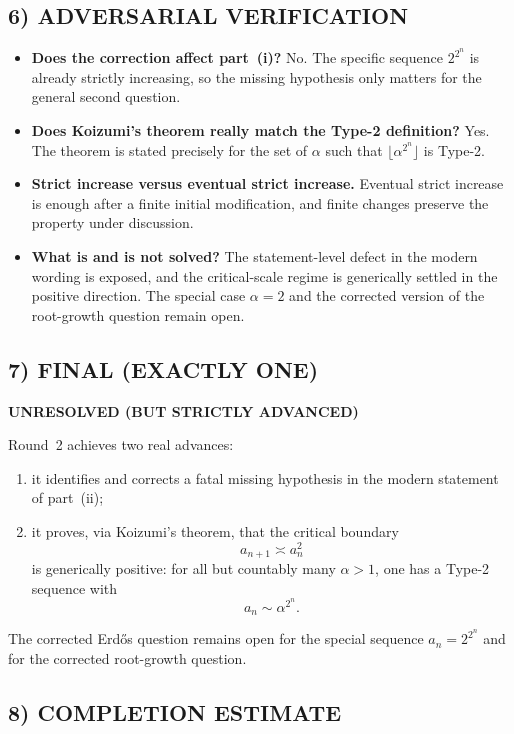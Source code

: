 \subsection*{6) ADVERSARIAL VERIFICATION}

\begin{itemize}
\item \textbf{Does the correction affect part~(i)?}  No.  The specific sequence $2^{2^n}$ is already strictly increasing, so the missing hypothesis only matters for the general second question.
\item \textbf{Does Koizumi's theorem really match the Type-2 definition?}  Yes.  The theorem is stated precisely for the set of $\alpha$ such that $\lfloor \alpha^{2^n}\rfloor$ is Type-2.
\item \textbf{Strict increase versus eventual strict increase.}  Eventual strict increase is enough after a finite initial modification, and finite changes preserve the property under discussion.
\item \textbf{What is and is not solved?}  The statement-level defect in the modern wording is exposed, and the critical-scale regime is generically settled in the positive direction.  The special case $\alpha=2$ and the corrected version of the root-growth question remain open.
\end{itemize}

\subsection*{7) FINAL (EXACTLY ONE)}

\textbf{UNRESOLVED (BUT STRICTLY ADVANCED)}

Round~2 achieves two real advances:

\begin{enumerate}
\item it identifies and corrects a fatal missing hypothesis in the modern statement of part~(ii);
\item it proves, via Koizumi's theorem, that the critical boundary
\[
a_{n+1}\asymp a_n^2
\]
is generically positive: for all but countably many $\alpha>1$, one has a Type-2 sequence with
\[
a_n\sim \alpha^{2^n}.
\]
\end{enumerate}

The corrected Erd\H{o}s question remains open for the special sequence $a_n=2^{2^n}$ and for the corrected root-growth question.

\subsection*{8) COMPLETION ESTIMATE}

